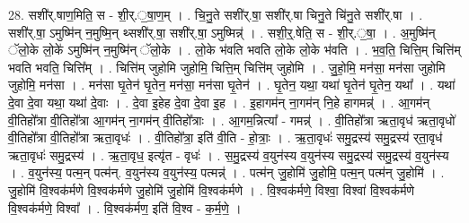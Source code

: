 \documentclass[17pt]{extarticle}
\begin{document}
28. सशी॑र्.षाण॒मिति॒ स - शी॒र्.॒षा॒ण॒म् । . चि॒नु॒ते सशी॑र्.षा॒ सशी॑र्.षा चिनु॒ते चि॑नु॒ते सशी॑र्.षा । . सशी॑र्.षा॒ ऽमुष्मि॑न् न॒मुष्मि॒न् थ्सशी॑र्.षा॒ सशी॑र्.षा॒ ऽमुष्मिन्न्॑ । . सशी॒र्॒.षेति॒ स - शी॒र्.॒षा॒ । . अ॒मुष्मि॑न् ॅलो॒के लो॒के॑ ऽमुष्मि॑न् न॒मुष्मि॑न् ॅलो॒के । . लो॒के भ॑वति भवति लो॒के लो॒के भ॑वति । . भ॒व॒ति॒ चित्ति॒म् चित्ति॑म् भवति भवति॒ चित्ति᳚म् । . चित्ति॑म् जुहोमि जुहोमि॒ चित्ति॒म् चित्ति॑म् जुहोमि । . जु॒हो॒मि॒ मन॑सा॒ मन॑सा जुहोमि जुहोमि॒ मन॑सा । . मन॑सा घृ॒तेन॑ घृ॒तेन॒ मन॑सा॒ मन॑सा घृ॒तेन॑ । . घृ॒तेन॒ यथा॒ यथा॑ घृ॒तेन॑ घृ॒तेन॒ यथा᳚ । . यथा॑ दे॒वा दे॒वा यथा॒ यथा॑ दे॒वाः । . दे॒वा इ॒हेह दे॒वा दे॒वा इ॒ह । . इ॒हागम॑न् ना॒गम॑न् नि॒हे हागमन्न्॑ । . आ॒गम॑न् वी॒तिहो᳚त्रा वी॒तिहो᳚त्रा आ॒गम॑न् ना॒गम॑न् वी॒तिहो᳚त्राः । . आ॒गम॒न्नित्या᳚ - गमन्न्॑ । . वी॒तिहो᳚त्रा ऋता॒वृध॑ ऋता॒वृधो॑ वी॒तिहो᳚त्रा वी॒तिहो᳚त्रा 
ऋता॒वृधः॑ । . वी॒तिहो᳚त्रा॒ इति॑ वी॒ति - हो॒त्राः॒ । . ऋ॒ता॒वृधः॑ समु॒द्रस्य॑ समु॒द्रस्य॑ र्‌ता॒वृध॑ ऋता॒वृधः॑ समु॒द्रस्य॑ । . ऋ॒ता॒वृध॒ इत्यृ॑त - वृधः॑ । . स॒मु॒द्रस्य॑ व॒युन॑स्य व॒युन॑स्य समु॒द्रस्य॑ समु॒द्रस्य॑ व॒युन॑स्य । . व॒युन॑स्य॒ पत्म॒न् पत्म॑न्. व॒युन॑स्य व॒युन॑स्य॒ पत्मन्न्॑ । . पत्म॑न् जु॒होमि॑ जु॒होमि॒ पत्म॒न् पत्म॑न् जु॒होमि॑ । . जु॒होमि॑ वि॒श्वक॑र्मणे वि॒श्वक॑र्मणे जु॒होमि॑ जु॒होमि॑ वि॒श्वक॑र्मणे । . वि॒श्वक॑र्मणे॒ विश्वा॒ विश्वा॑ वि॒श्वक॑र्मणे वि॒श्वक॑र्मणे॒ विश्वा᳚ । . वि॒श्वक॑र्मण॒ इति॑ वि॒श्व - क॒र्म॒णे॒ । \newline
\end{document}
